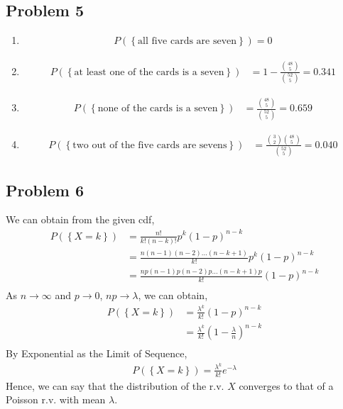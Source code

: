 \documentclass{article}
\begin{document}
	\subsection*{Problem 5}
		\begin{enumerate}
			\item
				\begin{align*}
					P\left(\left\{ \text{all five cards are seven} \right\}\right) = 0
				\end{align*}
			\item
				\begin{align*}
					P\left(\left\{ \text{at least one of the cards is a seven} \right\}\right) &= 1 - \frac{\binom{48}{5}}{\binom{52}{5}} = 0.341
				\end{align*}
			\item
				\begin{align*}
					P\left(\left\{ \text{none of the cards is a seven} \right\}\right) &= \frac{\binom{48}{5}}{\binom{52}{5}} = 0.659
				\end{align*}
			\item
				\begin{align*}
					P\left(\left\{ \text{two out of the five cards are sevens} \right\}\right) &= \frac{\binom{3}{2}\binom{48}{5}}{\binom{52}{5}} = 0.040
				\end{align*}
		\end{enumerate}

	\subsection*{Problem 6}
		We can obtain from the given cdf,
		\begin{align*}
			P(\left\{ X = k \right\}) &= \frac{n!}{k!(n-k)!} p^k (1-p)^{n-k} \\
			&= \frac{n(n-1)(n-2) \ldots (n-k+1)}{k!} p^k (1-p)^{n-k} \\
			&= \frac{np(n-1)p(n-2)p \ldots (n-k+1)p}{k!} (1-p)^{n-k} \\
		\end{align*}
		As $n \rightarrow \infty$ and $p \rightarrow 0$, $np \rightarrow \lambda$,
		we can obtain,
		\begin{align*}
			P(\left\{ X = k \right\}) &= \frac{\lambda^k}{k!} (1-p)^{n-k} \\
			&= \frac{\lambda^k}{k!} (1- \frac{\lambda}{n})^{n-k} \\ 
		\end{align*}
		By Exponential as the Limit of Sequence,
		\begin{align*}
			P(\left\{ X = k \right\}) = \frac{\lambda^k}{k!} e^{-\lambda}
		\end{align*}
		Hence, we can say that the distribution of the r.v. $X$ converges to that of
		a Poisson r.v. with mean $\lambda$.
\end{document}
